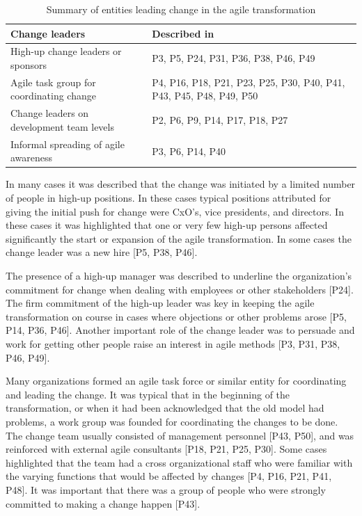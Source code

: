 \documentclass[preprint,authoryear,12pt]{elsarticle}
\begin{document}
\begin{table}[h]
    \centering
    \begin{tabular}{ >{\raggedright\arraybackslash}p{}
                     >{\raggedright\arraybackslash}p{} }
        \toprule
        Change leaders         &  Described in  \\
        \midrule
        High-up change leaders or sponsors  &
                P3, P5, P24, P31, P36, P38, P46, P49  \\
        Agile task group for coordinating change   &
                P4, P16, P18, P21, P23, P25, P30, P40, P41,
                P43, P45, P48, P49, P50  \\
        Change leaders on development team levels  &
                P2, P6, P9, P14, P17, P18, P27  \\
        Informal spreading of agile awareness  &
                P3, P6, P14, P40  \\
        \bottomrule
    \end{tabular}
    \caption{Summary of entities leading change in the agile transformation}
    \label{table:transformation_leadership}
\end{table}



In many cases it was described that the change was initiated by a limited number
of people in high-up positions. In these cases typical positions attributed for
giving the initial push for change were CxO's, vice presidents, and directors.
In these cases it was highlighted that one or very few high-up persons affected
significantly the start or expansion of the agile transformation. In some cases
the change leader was a new hire [P5, P38, P46].

The presence of a high-up manager was described to underline the organization's
commitment for change when dealing with employees or other stakeholders [P24].
The firm commitment of the high-up leader was key in keeping the agile
transformation on course in cases where objections or other problems arose [P5,
P14, P36, P46]. Another important role of the change leader was to persuade and
work for getting other people raise an interest in agile methods [P3, P31, P38,
P46, P49].


Many organizations formed an agile task force or similar entity for coordinating
and leading the change. It was typical that in the beginning of the
transformation, or when it had been acknowledged that the old model had
problems, a work group was founded for coordinating the changes to be done. The
change team usually consisted of management personnel [P43, P50], and was
reinforced with external agile consultants [P18, P21, P25, P30]. Some cases
highlighted that the team had a cross organizational staff who were familiar
with the varying functions that would be affected by changes [P4, P16, P21, P41,
P48]. It was important that there was a group of people who were strongly
committed to making a change happen [P43].
\end{document}
